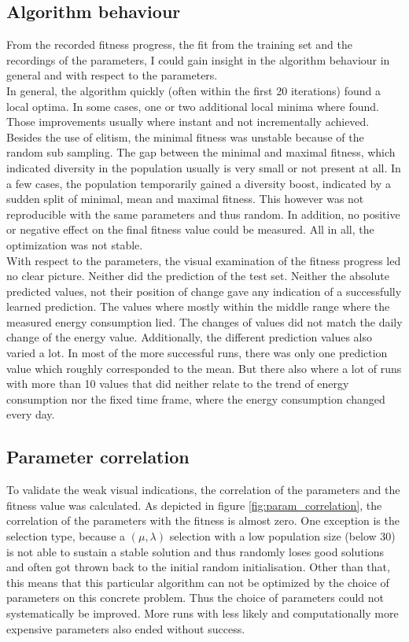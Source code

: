 \documentclass[conference]{IEEEtran}
\begin{document}
\subsection{Algorithm behaviour}
From the recorded fitness progress, the fit from the training set and the recordings of the parameters, I could gain insight in the algorithm behaviour in general and with respect to the parameters.\\
In general, the algorithm quickly (often within the first 20 iterations) found a local optima. In some cases, one or two additional local minima where found. Those improvements usually where instant and not incrementally achieved. Besides the use of elitism, the minimal fitness was unstable because of the random sub sampling. The gap between the minimal and maximal fitness, which indicated diversity in the population usually is very small or not present at all. In a few cases, the population temporarily gained a diversity boost, indicated by a sudden split of minimal, mean and maximal fitness. This however was not reproducible with the same parameters and thus random. In addition, no positive or negative effect on the final fitness value could be measured. All in all, the optimization was not stable.\\
With respect to the parameters, the visual examination of the fitness progress led no clear picture. Neither did the prediction of the test set. Neither the absolute predicted values, not their position of change gave any indication of a successfully learned prediction. The values where mostly within the middle range where the measured energy consumption lied. The changes of values did not match the daily change of the energy value. Additionally, the different prediction values also varied a lot. In most of the more successful runs, there was only one prediction value which roughly corresponded to the mean. But there also where a lot of runs with more than 10 values that did neither relate to the trend of energy consumption nor the fixed time frame, where the energy consumption changed every day.

\subsection{Parameter correlation}
To validate the weak visual indications, the correlation of the parameters and the fitness value was calculated. As depicted in figure \ref{fig:param_correlation}, the correlation of the parameters with the fitness is almost zero. One exception is the selection type, because a $(\mu,\lambda)$ selection with a low population size (below 30) is not able to sustain a stable solution and thus randomly loses good solutions and often got thrown back to the initial random initialisation. Other than that, this means that this particular algorithm can not be optimized by the choice of parameters on this concrete problem. Thus the choice of parameters could not systematically be improved. More runs with less likely and computationally more expensive parameters also ended without success.
\end{document}
